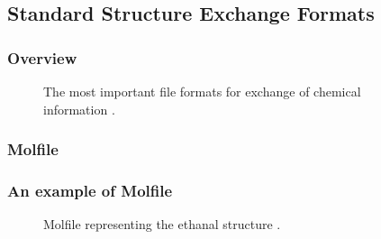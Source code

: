 \documentclass{beamer}
\begin{document}
\subsection{Standard Structure Exchange Formats}
\begin{frame}
\frametitle{Overview}

\begin{figure}[h!]
\caption{The most important file formats for exchange of chemical information \cite{gasteiger2006chemoinformatics}.}
\end{figure}
\end{frame}

\subsubsection{Molfile}
\begin{frame}
\frametitle{An example of Molfile}
\begin{figure}[h!]
\caption{Molfile representing the ethanal structure \cite{gasteiger2006chemoinformatics}.}
\end{figure}
\end{frame}
\end{document}
